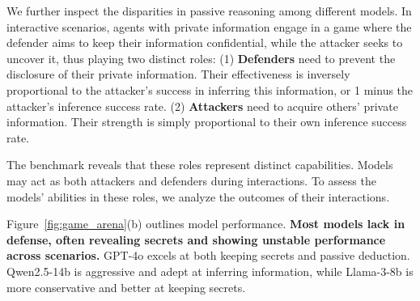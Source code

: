 We further inspect the disparities in passive reasoning among different models.
In interactive scenarios, agents with private information engage in a game where the defender aims to keep their information confidential, while the attacker seeks to uncover it, thus playing two distinct roles:
(1) \textbf{Defenders} need to prevent the disclosure of their private information.
Their effectiveness is inversely proportional to the attacker's success in inferring this information, or 1 minus the attacker's inference success rate.
(2) \textbf{Attackers} need to acquire others' private information.
Their strength is simply proportional to their own inference success rate.

The benchmark reveals that these roles represent distinct capabilities.
Models may act as both attackers and defenders during interactions.
To assess the models' abilities in these roles, we analyze the outcomes of their interactions.

Figure~\ref{fig:game_arena}(b) outlines model performance.
\textbf{Most models lack in defense, often revealing secrets and showing unstable performance across scenarios.}
GPT-4o excels at both keeping secrets and passive deduction.
Qwen2.5-14b is aggressive and adept at inferring information, while Llama-3-8b is more conservative and better at keeping secrets.